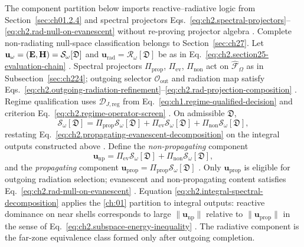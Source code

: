 The component partition below imports reactive--radiative logic from
Section~\ref{sec:ch01.2.4} and spectral projectors
Eqs.~\eqref{eq:ch2.spectral-projectors}--\eqref{eq:ch2.rad-null-on-evanescent} without
re-proving projector algebra \cite{stratton1941}. Complete non-radiating null-space
classification belongs to Section~\ref{sec:ch27}.
Let \(\mathbf{u}_\omega=(\mathbf{E},\mathbf{H})=\mathcal{S}_\omega[\mathfrak{D}]\) and
\(\mathbf{u}_{\mathrm{rad}}=\mathcal{R}_\omega[\mathfrak{D}]\) be as in
Eq.~\eqref{eq:ch2.section25-evaluation-chain} \cite{stratton1941}. Spectral
projectors \(\Pi_{\mathrm{prop}}\), \(\Pi_{\mathrm{ev}}\), \(\Pi_{\mathrm{non}}\) act on
\(\widehat{\mathcal{F}}_\Omega\) as in Subsection~\ref{sec:ch224}; outgoing selector
\(\mathcal{O}_{\mathrm{out}}\) and radiation map satisfy
Eqs.~\eqref{eq:ch2.outgoing-radiation-refinement}--\eqref{eq:ch2.rad-projection-composition}
\cite{stratton1941}. Regime qualification uses
\(\mathcal{D}_{J,\mathrm{reg}}\) from Eq.~\eqref{eq:ch1.regime-qualified-decision} and
criterion Eq.~\eqref{eq:ch2.regime-operator-screen} \cite{stratton1941}.
On admissible \(\mathfrak{D}\),
\begin{equation}
\label{eq:ch2.integral-spectral-decomposition}
\mathcal{S}_\omega[\mathfrak{D}]
=
\Pi_{\mathrm{prop}}\mathcal{S}_\omega[\mathfrak{D}]
+\Pi_{\mathrm{ev}}\mathcal{S}_\omega[\mathfrak{D}]
+\Pi_{\mathrm{non}}\mathcal{S}_\omega[\mathfrak{D}],
\end{equation}
restating Eq.~\eqref{eq:ch2.propagating-evanescent-decomposition} on the integral outputs
constructed above \cite{stratton1941}.
Define the \emph{non-propagating} component
\begin{equation}
\label{eq:ch2.nonpropagating-component-def}
\mathbf{u}_{\mathrm{np}}
=
\Pi_{\mathrm{ev}}\mathcal{S}_\omega[\mathfrak{D}]
+\Pi_{\mathrm{non}}\mathcal{S}_\omega[\mathfrak{D}],
\end{equation}
and the \emph{propagating} component
\(\mathbf{u}_{\mathrm{prop}}=\Pi_{\mathrm{prop}}\mathcal{S}_\omega[\mathfrak{D}]\)
\cite{stratton1941}. Only \(\mathbf{u}_{\mathrm{prop}}\) is eligible for outgoing radiation
selection; evanescent and non-propagating content satisfies
Eq.~\eqref{eq:ch2.rad-null-on-evanescent} \cite{harrington2001}. Equation
\eqref{eq:ch2.integral-spectral-decomposition} applies the \ref{ch:01} partition to
integral outputs: reactive dominance on near shells corresponds to large
\(\|\mathbf{u}_{\mathrm{np}}\|\) relative to \(\|\mathbf{u}_{\mathrm{prop}}\|\) in the sense
of Eq.~\eqref{eq:ch2.subspace-energy-inequality} \cite{stratton1941}.
The radiative component is the far-zone equivalence class formed only after outgoing completion.
